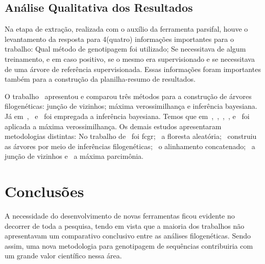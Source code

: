 \documentclass[12pt]{article}
\begin{document}
\subsection{Análise Qualitativa dos Resultados}

Na etapa de extração, realizada com o auxílio da ferramenta \gls{parsifal}, houve o levantamento da resposta para 4(quatro) informações importantes para o trabalho: Qual método de genotipagem foi utilizado; Se necessitava de algum treinamento, e em caso positivo, se o mesmo era supervisionado e se necessitava de uma árvore de referência supervisionada. Essas informações foram importantes também para a construção da planilha-resumo de resultados.

O trabalho~\cite{dimitrov_updated_2019} apresentou e comparou três métodos para a construção de árvores filogenéticas: junção de vizinhos; máxima verossimilhança e inferência bayesiana.
Já em~\cite{yin_systematic_2019},~\cite{bedoya-pilozo_molecular_epidemiology_2018} e~\cite{dimitrov_updated_2019} foi empregada a inferência bayesiana. Temos que em~\cite{fall_genetic_diversity_2021},~\cite{behl_threat_2022},~\cite{shabbir_comprehensive_2020},~\cite{dimitrov_updated_2019},\newline\cite{hudu_hepatitis_2018} e~\cite{cho_analysis_2022} foi aplicada a máxima verossimilhança.
Os demais estudos apresentaram metodologias distintas: No trabalho de~\cite{lichtblau_alignment-free_2019} foi \gls{fcgr};~\cite{kim_ngs_2022} a floresta aleatória;~\cite{sallard_tracing_2021} construiu as árvores por meio de inferências filogenéticas;~\cite{paez-espino_diversity_evolution_2019} o alinhamento concatenado;~\cite{potdar_phylogenetic_2021} a junção de vizinhos e~\cite{tang_evolutionary_2021} a máxima parcimônia.

\section{Conclusões}

A necessidade do desenvolvimento de novas ferramentas ficou evidente no decorrer de toda a pesquisa, tendo em vista que a maioria dos trabalhos não apresentavam um comparativo conclusivo entre as análises filogenéticas. Sendo assim, uma nova metodologia para genotipagem de sequências contribuiria com um grande valor científico nessa área.



\end{document}
